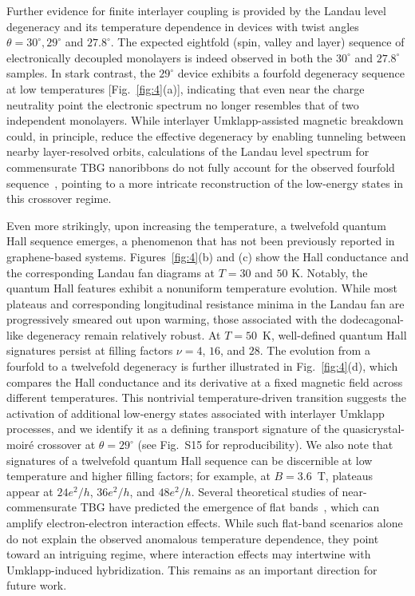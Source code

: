 \documentclass[reprint,
superscriptaddress,amsmath,amssymb,aps,prl]{revtex4-2}
\begin{document}
Further evidence for finite interlayer coupling is provided by the Landau level degeneracy and its temperature dependence in devices with twist angles $\theta=30^\circ,29^\circ$ and $27.8^\circ$. The expected eightfold (spin, valley and layer) sequence of electronically decoupled monolayers is indeed observed in both the $30^\circ$ and $27.8^\circ$ samples. In stark contrast, the $29^\circ$ device exhibits a fourfold degeneracy sequence at low temperatures [Fig.~\ref{fig:4}(a)], indicating that even near the charge neutrality point the electronic spectrum no longer resembles that of two independent monolayers. While interlayer Umklapp-assisted magnetic breakdown could, in principle, reduce the effective degeneracy by enabling tunneling between nearby layer-resolved orbits, calculations of the Landau level spectrum for commensurate TBG nanoribbons do not fully account for the observed fourfold sequence~\cite{SI}, pointing to a more intricate reconstruction of the low-energy states in this crossover regime.



Even more strikingly, upon increasing the temperature, a twelvefold quantum Hall sequence emerges, a phenomenon that has not been previously reported in graphene-based systems. Figures~\ref{fig:4}(b) and (c) show the Hall conductance and the corresponding Landau fan diagrams at $T=30$ and $50$ K. Notably, the quantum Hall features exhibit a nonuniform temperature evolution. While most plateaus and corresponding longitudinal resistance minima in the Landau fan are progressively smeared out upon warming, those associated with the dodecagonal-like degeneracy remain relatively robust. At $T = 50$~K, well-defined quantum Hall signatures persist at filling factors $\nu = 4$, $16$, and $28$. The evolution from a fourfold to a twelvefold degeneracy is further illustrated in Fig.~\ref{fig:4}(d), which compares the Hall conductance and its derivative at a fixed magnetic field across different temperatures. This nontrivial temperature-driven transition suggests the activation of additional low-energy states associated with interlayer Umklapp processes, and we identify it as a defining transport signature of the quasicrystal-moir\'{e} crossover at $\theta=29^\circ$ (see Fig.~S15 for reproducibility). We also note that signatures of a twelvefold quantum Hall sequence can be discernible at low temperature and higher filling factors; for example, at $B = 3.6$~T, plateaus appear at $24e^2/h$, $36e^2/h$, and $48e^2/h$. Several theoretical studies of near-commensurate TBG have predicted the emergence of flat bands~\cite{pal_theory_2014,pal_emergent_2019}, which can amplify electron-electron interaction effects. While such flat-band scenarios alone do not explain the observed anomalous temperature dependence, they point toward an intriguing regime, where interaction effects may intertwine with Umklapp-induced hybridization. This remains as an important direction for future work.
\end{document}
